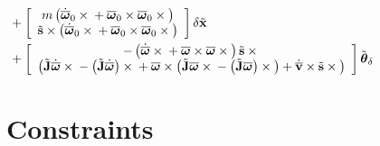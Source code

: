 \documentclass[10pt,dvips,fleqn,subeqn]{report}
\newcommand{\T}[1]{\bm{\mathbf{#1}}}
\newcommand{\TT}[1]{\bm{\mathbf{#1}}}
\begin{document}
\begin{align}
	\nonumber \\ & \hspace{-20mm}
	+ \sqbr{\matr{c}{
		m \plbr{
			\dot{\overline{\T{\omega}}}_0 \times{}
			+ \overline{\T{\omega}}_0 \times \overline{\T{\omega}}_0 \times{}
		} \\
		\tilde{\T{s}} \times \plbr{
			\dot{\overline{\T{\omega}}}_0 \times{}
			+ \overline{\T{\omega}}_0 \times \overline{\T{\omega}}_0 \times{}
		}
	}} \delta\tilde{\T{x}}
	\nonumber \\ & \hspace{-20mm}
	+ \sqbr{\matr{c}{
		- \plbr{
			\dot{\overline{\T{\omega}}} \times{}
			+ \overline{\T{\omega}} \times \overline{\T{\omega}} \times{}
		} \tilde{\T{s}}\times{} \\
		\plbr{
			\tilde{\TT{J}} \dot{\overline{\T{\omega}}} \times{}
			- \plbr{\tilde{\TT{J}} \dot{\overline{\T{\omega}}}} \times{}
			+ \overline{\T{\omega}} \times \plbr{
				\tilde{\T{J}} \overline{\T{\omega}} \times{}
				- \plbr{\tilde{\TT{J}} \overline{\T{\omega}}} \times{}
			}
			+ \dot{\overline{\T{v}}} \times \tilde{\T{s}} \times{}
		}
	}} \tilde{\T{\theta}}_{\delta}
\end{align}








\chapter{Constraints}
\end{document}
